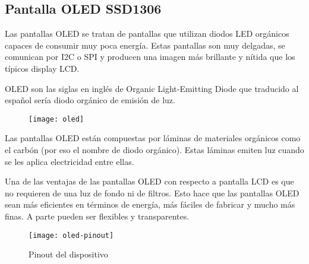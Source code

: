 \documentclass[../informe_krapp.tex]{subfiles}
\begin{document}
\clearpage

\subsection{Pantalla OLED SSD1306}
Las pantallas OLED se tratan de pantallas que utilizan diodos LED orgánicos capaces de consumir muy poca energía.
Estas pantallas son muy delgadas, se comunican por I2C o SPI y producen una imagen más brillante y nítida que los típicos display LCD.

OLED son las siglas en inglés de Organic Light-Emitting Diode que traducido al español sería diodo orgánico de emisión de luz.

\begin{figure}[H]
	\texttt{[image: oled]}
	\centering
\end{figure}

Las pantallas OLED están compuestas por láminas de materiales orgánicos como el carbón (por eso el nombre de diodo orgánico). Estas láminas emiten luz cuando se les aplica electricidad entre ellas.

Una de las ventajas de las pantallas OLED con respecto a pantalla LCD es que no requieren de una luz de fondo ni de filtros. Esto hace que las pantallas OLED sean más eficientes en términos de energía, más fáciles de fabricar y mucho más finas. A parte pueden ser flexibles y transparentes.

\begin{figure}[H]
	\texttt{[image: oled-pinout]}
	\centering
	\caption{Pinout del dispositivo}
\end{figure}
\end{document}
